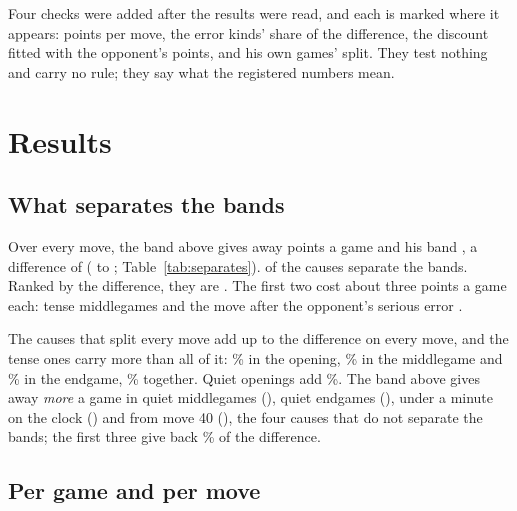 \documentclass[11pt]{article}
\begin{document}
Four checks were added after the results were read, and each is marked where it appears: points per
move, the error kinds' share of the difference, the discount fitted with the opponent's points, and
his own games' split. They test nothing and carry no rule; they say what the registered numbers mean.

\section{Results}

\subsection{What separates the bands}

Over every move, the band above gives away \AllAbove{} points a game and his band \AllHis, a
difference of \AllDelta{} (\AllDeltaLo{} to \AllDeltaHi; Table~\ref{tab:separates}). \SeparateCap{}
of the \Causes{} causes separate the bands. Ranked by the difference, they are \RankedList. The first
two cost about three points a game each: tense middlegames \MiddlegameTenseDelta{} and the move
after the opponent's serious error \AfterGiftDelta.

The \PartitionCauses{} causes that split every move add up to the difference on every move, and the
tense ones carry more than all of it: \OpeningTenseShare\% in the opening, \MiddlegameTenseShare\%
in the middlegame and \EndgameTenseShare\% in the endgame, \TenseShare\% together. Quiet openings
add \OpeningQuietShare\%. The band above gives away \emph{more} a game in quiet middlegames
(\MiddlegameQuietDelta), quiet endgames (\EndgameQuietDelta), under a minute on the clock
(\ClockLowDelta) and from move 40 (\LateDelta), the four causes that do not separate the bands; the
first three give back \GiveBack\% of the difference.

\begin{table}[h]
\centering
\scriptsize\SeparatesTable
\caption{What separates the bands: points a game given away on each cause at his level
(\HisLo--\HisHi) and the band above (\AboveLo--\AboveHi), the difference $\Delta$ (above minus his)
with its 95\% interval, the Holm-adjusted $p$, the rule's verdict, and each partition cause's share
of the difference on every move. The first seven causes split every move; the next three overlap
them.}
\label{tab:separates}
\end{table}

\subsection{Per game and per move}
\end{document}
